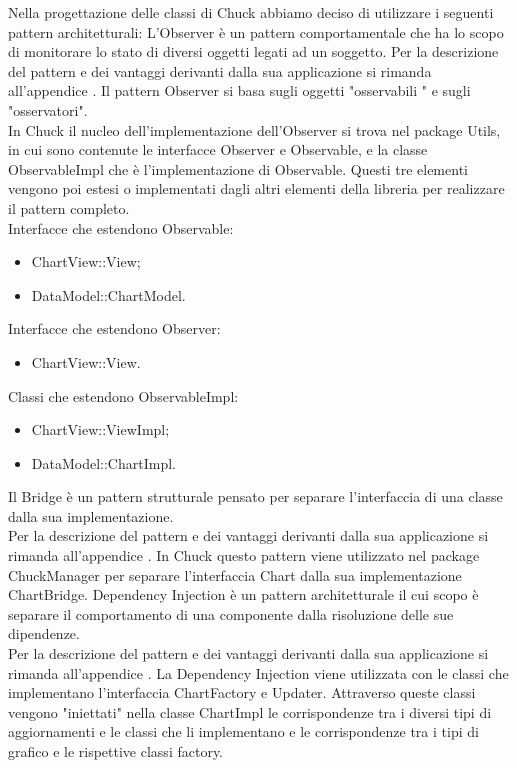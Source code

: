 Nella progettazione delle classi di Chuck abbiamo deciso di utilizzare i seguenti pattern architetturali:
	L'Observer è un pattern comportamentale che ha lo scopo di monitorare lo stato di diversi oggetti legati ad un soggetto.
	Per la descrizione del pattern e dei vantaggi derivanti dalla sua applicazione si rimanda all'appendice .
	Il pattern Observer si basa sugli oggetti "osservabili " e sugli "osservatori". \\In Chuck il nucleo dell'implementazione dell'Observer si trova nel package Utils, in cui sono contenute le interfacce Observer e Observable, e la classe ObservableImpl che è l'implementazione di Observable. Questi tre elementi vengono poi estesi o implementati dagli altri elementi della libreria per realizzare il pattern completo.\\
	Interfacce che estendono Observable:
	\begin{itemize}
	\item ChartView::View;
	\item DataModel::ChartModel.
	\end{itemize}
	Interfacce che estendono Observer:
	\begin{itemize}
	\item ChartView::View.
	\end{itemize}
	Classi che estendono ObservableImpl:
	\begin{itemize}
	\item ChartView::ViewImpl;
	\item DataModel::ChartImpl.
	\end{itemize}
	Il Bridge è un pattern strutturale pensato per separare l'interfaccia di una classe dalla sua implementazione.\\ Per la descrizione del pattern e dei vantaggi derivanti dalla sua applicazione si rimanda all'appendice .
	In Chuck questo pattern viene utilizzato nel package ChuckManager per separare l'interfaccia Chart dalla sua implementazione ChartBridge.
	Dependency Injection è un pattern architetturale il cui scopo è separare il comportamento di una componente dalla risoluzione delle sue dipendenze.\\
	Per la descrizione del pattern e dei vantaggi derivanti dalla sua applicazione si rimanda all'appendice .
	La Dependency Injection viene utilizzata con le classi che implementano l'interfaccia ChartFactory e Updater. Attraverso queste classi vengono "iniettati" nella classe ChartImpl le corrispondenze tra i diversi tipi di aggiornamenti e le classi che li implementano e le corrispondenze tra i tipi di grafico e le rispettive classi factory.
